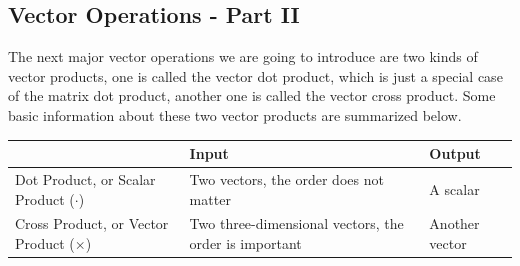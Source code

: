 \subsection{Vector Operations - Part II}
\label{vectorops}
The next major vector operations we are going to introduce are two kinds of vector products, one is called the vector dot product, which is just a special case of the matrix dot product, another one is called the vector cross product. Some basic information about these two vector products are summarized below.
\begin{center}
\begin{tabular}{|p{30mm}|p{50mm}|p{15mm}|}
\hline
 & Input & Output \\
\hline
Dot Product, or Scalar Product ($\cdot$) & Two vectors, the order does not matter & A scalar\\
\hline
Cross Product, or Vector Product ($\times$) & Two three-dimensional vectors, the order is important & Another vector
\\
\hline
\end{tabular}
\end{center}

